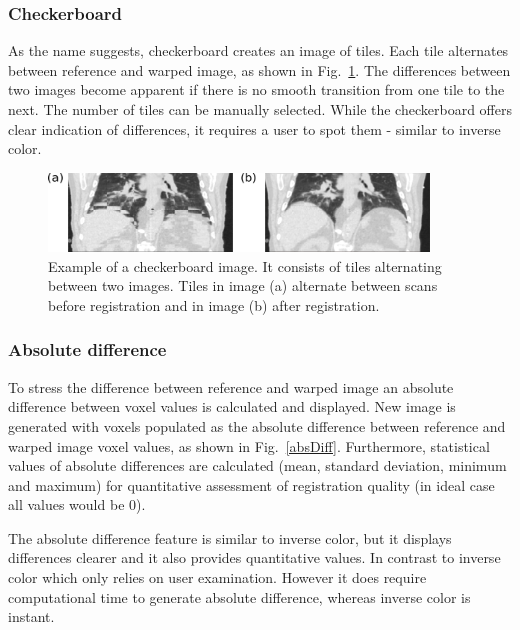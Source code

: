 \documentclass[type=dr, dr=rernat, accentcolor=tud7b,colorbacktitle, bigchapter, openright, twoside, 12pt ]{tudthesis}
\begin{document}
\subsubsection{Checkerboard}

As the name suggests, checkerboard creates an image of tiles. Each tile alternates between reference and warped image, as shown in Fig.~\ref{checkerboard}. The differences between two images become apparent if there is no smooth transition from one tile to the next. The number of tiles can be manually selected. While the checkerboard offers clear indication of differences, it requires a user to spot them - similar to inverse color.

\begin{figure}[H]
	\begin{center}		
		\includegraphics[width=0.9\textwidth]{./Images/checkerboard.png}
		\caption{Example of a checkerboard image. It consists of tiles alternating between two images. Tiles in image (a) alternate between scans before registration and in image (b) after registration.}
		\label{checkerboard}
	\end{center}
\end{figure}

\subsubsection{Absolute difference} 

To stress the difference between reference and warped image an absolute difference between voxel values is calculated and displayed. New image is generated with voxels populated as the absolute difference between reference and warped image voxel values, as shown in Fig.~\ref{absDiff}. Furthermore, statistical values of absolute differences are calculated (mean, standard deviation, minimum and maximum) for quantitative assessment of registration quality (in ideal case all values would be 0).

The absolute difference feature is similar to inverse color, but it displays differences clearer and it also provides quantitative values. In contrast to inverse color which only relies on user examination. However it does require computational time to generate absolute difference, whereas inverse color is instant.
\end{document}
